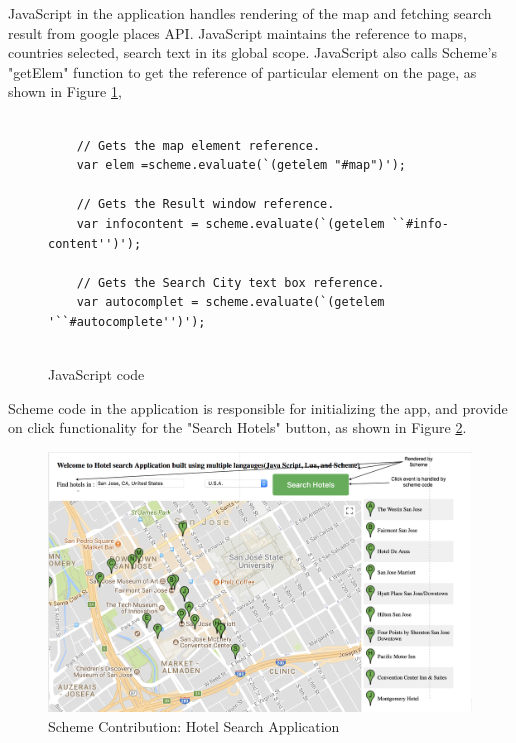 JavaScript in the application handles rendering of the map and fetching search result from google places API. JavaScript maintains the reference to maps, countries selected, search text in its global scope. JavaScript also calls Scheme's "getElem" function to get the reference of particular element on the page, as shown in Figure \ref{fig:js-code}, 

\begin{figure}[H]
	\begin{lstlisting}
	
	// Gets the map element reference.
	var elem =scheme.evaluate(`(getelem "#map")');
	
	// Gets the Result window reference.
	var infocontent = scheme.evaluate(`(getelem ``#info-content'')');
	
	// Gets the Search City text box reference.
	var autocomplet = scheme.evaluate(`(getelem '``#autocomplete'')');
	
	\end{lstlisting} 
	\caption{JavaScript code}
	\label{fig:js-code}
\end{figure}


Scheme code in the application is responsible for initializing the app, and provide on click functionality for the "Search Hotels" button, as shown in Figure \ref{fig:schemeINteraction}.

\begin{figure}[H]
	\begin{center}
		\includegraphics[width=\linewidth]{./images/schemeINteraction.png}
	\end{center}
	\caption{Scheme Contribution: Hotel Search Application}
	\label{fig:schemeINteraction}
\end{figure}

